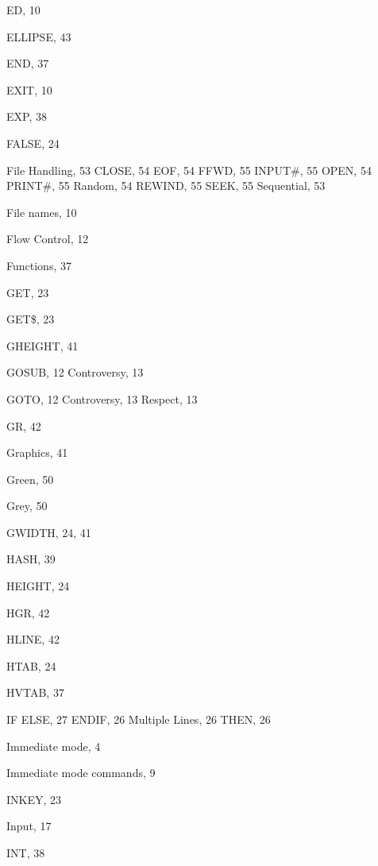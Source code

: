 \begin{theindex}
  \indexspace

  \item ED, 10
  \item ELLIPSE, 43
  \item END, 37
  \item EXIT, 10
  \item EXP, 38

  \indexspace

  \item FALSE, 24
  \item File Handling, 53
    \subitem CLOSE, 54
    \subitem EOF, 54
    \subitem FFWD, 55
    \subitem INPUT\#, 55
    \subitem OPEN, 54
    \subitem PRINT\#, 55
    \subitem Random, 54
    \subitem REWIND, 55
    \subitem SEEK, 55
    \subitem Sequential, 53
  \item File names, 10
  \item Flow Control, 12
  \item Functions, 37

  \indexspace

  \item GET, 23
  \item GET\$, 23
  \item GHEIGHT, 41
  \item GOSUB, 12
    \subitem Controversy, 13
  \item GOTO, 12
    \subitem Controversy, 13
    \subitem Respect, 13
  \item GR, 42
  \item Graphics, 41
  \item Green, 50
  \item Grey, 50
  \item GWIDTH, 24, 41

  \indexspace

  \item HASH, 39
  \item HEIGHT, 24
  \item HGR, 42
  \item HLINE, 42
  \item HTAB, 24
  \item HVTAB, 37

  \indexspace

  \item IF
    \subitem ELSE, 27
    \subitem ENDIF, 26
    \subitem Multiple Lines, 26
    \subitem THEN, 26
  \item Immediate mode, 4
  \item Immediate mode commands, 9
  \item INKEY, 23
  \item Input, 17
  \item INT, 38


\end{theindex}
